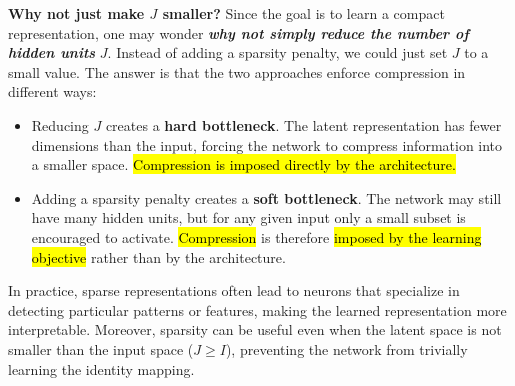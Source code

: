 \highspace
\textcolor{Green3}{ \textbf{Why not just make $J$ smaller?}} Since the goal is to learn a compact representation, one may wonder \textbf{\emph{why not simply reduce the number of hidden units}} $J$. Instead of adding a sparsity penalty, we could just set $J$ to a small value. The answer is that the two approaches enforce compression in different ways:
\begin{itemize}
    \item Reducing $J$ creates a \textbf{hard bottleneck}. The latent representation has fewer dimensions than the input, forcing the network to compress information into a smaller space. \hl{Compression is imposed directly by the architecture.}

    \item Adding a sparsity penalty creates a \textbf{soft bottleneck}. The network may still have many hidden units, but for any given input only a small subset is encouraged to activate. \hl{Compression} is therefore \hl{imposed by the learning objective} rather than by the architecture.
\end{itemize}
In practice, sparse representations often lead to neurons that specialize in detecting particular patterns or features, making the learned representation more interpretable. Moreover, sparsity can be useful even when the latent space is not smaller than the input space ($J \ge I$), preventing the network from trivially learning the identity mapping.

